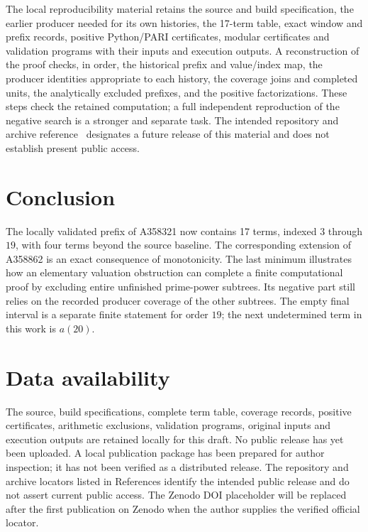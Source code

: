 \documentclass[11pt]{article}
\theoremstyle{remark}
\begin{document}
The local reproducibility material retains the source and build specification,
the earlier producer needed for its own histories, the 17-term table, exact
window and prefix records, positive Python/PARI certificates, modular
certificates and validation programs with their inputs and execution outputs.
A reconstruction of the proof checks, in order, the historical prefix and
value/index map, the producer identities appropriate to each history, the
coverage joins and completed units, the analytically excluded prefixes, and
the positive factorizations. These steps check the retained computation;
a full independent reproduction of the negative search is a stronger and
separate task. The intended repository and archive reference~\cite{corti}
designates a future release of this material and does not establish present
public access.

\section{Conclusion}
The locally validated prefix of A358321 now contains 17 terms, indexed
$3$ through $19$, with four terms beyond the source baseline.
The corresponding extension of A358862 is an exact consequence of monotonicity.
The last minimum illustrates how an elementary valuation obstruction can
complete a finite computational proof by excluding entire unfinished
prime-power subtrees. Its negative part still relies on the recorded
producer coverage of the other subtrees. The empty final interval is a
separate finite statement for order $19$; the next undetermined term
in this work is $a(20)$.

\section*{Data availability}
The source, build specifications, complete term table, coverage records,
positive certificates, arithmetic exclusions, validation programs, original
inputs and execution outputs are retained locally for this draft. No public
release has yet been uploaded. A local publication package has been prepared
for author inspection; it has not been verified as a distributed release.
The repository and archive locators listed in References identify the intended
public release and do
not assert current public access. The Zenodo DOI placeholder will be replaced
after the first publication on Zenodo when the author supplies the verified
official locator.
\end{document}
